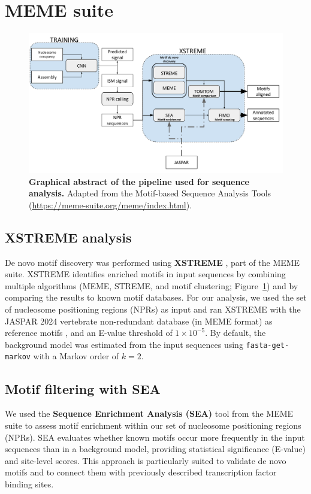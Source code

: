 \documentclass[11pt]{book}
\begin{document}
\section{MEME suite}
\begin{figure}[htbp]
    \includegraphics[width=\linewidth]{Figures/methods/xstreme_pipeline.pdf}
    \caption{\textbf{Graphical abstract of the pipeline used for sequence analysis.} Adapted from the Motif-based Sequence Analysis Tools (\url{https://meme-suite.org/meme/index.html}).}
    \label{fig:xstreme_pipeline}
\end{figure}

\subsection{XSTREME analysis}

De novo motif discovery was performed using \textbf{XSTREME} \cite{bailey_streme_2021}, 
part of the MEME suite. XSTREME identifies enriched motifs in input sequences by combining 
multiple algorithms (MEME, STREME, and motif clustering; Figure~\ref{fig:xstreme_pipeline}) 
and by comparing the results to known motif databases. For our analysis, we used the set of 
nucleosome positioning regions (NPRs) as input and ran XSTREME with the JASPAR 2024 vertebrate 
non-redundant database (in MEME format) as reference motifs \cite{rauluseviciute_jaspar_2024}, and an E-value threshold of 
\(1 \times 10^{-5}\). By default, the background model was estimated from the input sequences 
using \texttt{fasta-get-markov} with a Markov order of \(k=2\).

\subsection{Motif filtering with SEA}
We used the \textbf{Sequence Enrichment Analysis (SEA)} tool from the MEME suite 
to assess motif enrichment within our set of nucleosome positioning regions (NPRs). 
SEA evaluates whether known motifs occur more frequently in the input sequences than in 
a background model, providing statistical significance (E-value) and site-level scores. 
This approach is particularly suited to validate de novo motifs and to connect them with 
previously described transcription factor binding sites.
\end{document}
